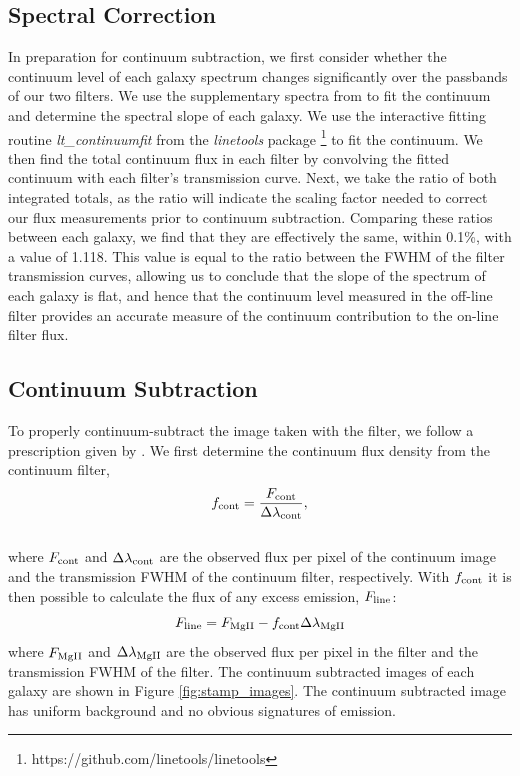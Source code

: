 \documentclass[twocolumn]{aastex61}
\begin{document}
\subsection{Spectral Correction}
In preparation for continuum subtraction, we first consider whether the continuum level of each galaxy spectrum changes significantly over the passbands of our two filters.
We use the supplementary spectra from \citet{Rubin_2014} to fit the continuum and determine the spectral slope of each galaxy. We use the interactive fitting routine \emph{lt\_continuumfit} from the \emph{linetools} package \citep{Prochaska2016}\footnote{https://github.com/linetools/linetools} to fit the continuum. We then find the total continuum flux in each filter by convolving the fitted continuum with each filter's transmission curve. Next, we take the ratio of both integrated totals, as the ratio will indicate the scaling factor needed to correct our flux measurements prior to continuum subtraction. Comparing these ratios between each galaxy, we find that they are effectively the same, within 0.1\%, with a value of 1.118. This value is equal to the ratio between the FWHM of the filter transmission curves, allowing us to conclude that the slope of the spectrum of each galaxy is flat, and hence that the continuum level measured in the off-line filter provides an accurate measure of the continuum contribution to the on-line filter flux.

\subsection{Continuum Subtraction}\label{subsec.cont_sub}

To properly continuum-subtract the image taken with the  filter, we follow a prescription given by \cite{Battaia_2015}. 
We first determine the continuum flux density from the continuum filter,
\begin{equation}
f_{\rm{cont}}=\frac{F_{\rm{cont}}}{\Delta \lambda_{\rm{cont}}},
\end{equation}\\
where $F_{\rm{cont}}$ and $\Delta \lambda_{\rm{cont}}$ are the observed flux per pixel of the continuum image and the transmission FWHM of the continuum filter, respectively. With $f_{\rm cont}$ it is then possible to calculate the flux of any excess emission, $F_{\rm{line}}$:
\begin{equation}
F_{\rm{line}}=F_{\rm{MgII}}-f_{\rm{cont}} \Delta \lambda_{\rm{MgII}}
\label{eq:subtraction}
\end{equation}
where $F_{\rm{MgII}}$ and $\Delta \lambda_{\rm MgII}$ are the observed flux per pixel in the  filter and the transmission FWHM of the  filter. The continuum subtracted images of each galaxy are shown in Figure \ref{fig:stamp_images}. The continuum subtracted image has uniform background and no obvious signatures of emission.
\end{document}
